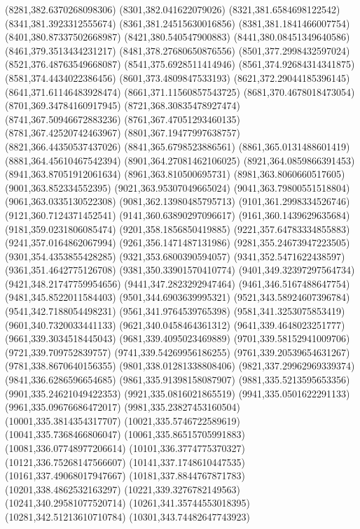 {(8281,382.6370268098306)
(8301,382.041622079026)
(8321,381.6584698122542)
(8341,381.3923312555674)
(8361,381.24515630016856)
(8381,381.1841466007754)
(8401,380.87337502668987)
(8421,380.540547900883)
(8441,380.08451349640586)
(8461,379.3513434231217)
(8481,378.27680650876556)
(8501,377.2998432597024)
(8521,376.48763549668087)
(8541,375.6928511414946)
(8561,374.92684314341875)
(8581,374.4434022386456)
(8601,373.4809847533193)
(8621,372.29044185396145)
(8641,371.61146483928474)
(8661,371.11560857543725)
(8681,370.4678018473054)
(8701,369.34784160917945)
(8721,368.30835478927474)
(8741,367.50946672883236)
(8761,367.47051293460135)
(8781,367.42520742463967)
(8801,367.19477997638757)
(8821,366.44350537437026)
(8841,365.6798523886561)
(8861,365.0131488601419)
(8881,364.45610467542394)
(8901,364.27081462106025)
(8921,364.0859866391453)
(8941,363.87051912061634)
(8961,363.810500695731)
(8981,363.8060660517605)
(9001,363.852334552395)
(9021,363.95307049665024)
(9041,363.79800551518804)
(9061,363.0335130522308)
(9081,362.13980485795713)
(9101,361.2998334526746)
(9121,360.7124371452541)
(9141,360.63890297096617)
(9161,360.1439629635684)
(9181,359.0231806085474)
(9201,358.1856850419885)
(9221,357.64783334855883)
(9241,357.0164862067994)
(9261,356.1471487131986)
(9281,355.24673947223505)
(9301,354.4353855428285)
(9321,353.6800390594057)
(9341,352.5471622438597)
(9361,351.4642775126708)
(9381,350.33901570410774)
(9401,349.32397297564734)
(9421,348.21747759954656)
(9441,347.2823292947464)
(9461,346.5167488647754)
(9481,345.8522011584403)
(9501,344.6903639995321)
(9521,343.58924607396784)
(9541,342.7188054498231)
(9561,341.9764539765398)
(9581,341.3253075853419)
(9601,340.7320033441133)
(9621,340.0458464361312)
(9641,339.4648023251777)
(9661,339.3034518445043)
(9681,339.4095023469889)
(9701,339.58152941009706)
(9721,339.709752839757)
(9741,339.54269956186255)
(9761,339.20539654631267)
(9781,338.8670640156355)
(9801,338.01281338808406)
(9821,337.29962969339374)
(9841,336.6286596654685)
(9861,335.91398158087907)
(9881,335.5213595653356)
(9901,335.24621049422353)
(9921,335.0816021865519)
(9941,335.0501622291133)
(9961,335.09676686472017)
(9981,335.23827453160504)
(10001,335.3814354317707)
(10021,335.5746722589619)
(10041,335.7368466806047)
(10061,335.86515705991883)
(10081,336.07748977206614)
(10101,336.3774775370327)
(10121,336.75268147566607)
(10141,337.1748610447535)
(10161,337.49068017947667)
(10181,337.8844767871783)
(10201,338.4862532163297)
(10221,339.3276782149563)
(10241,340.29581077520714)
(10261,341.35744553018395)
(10281,342.51213610710784)
(10301,343.74482647743923)
}
